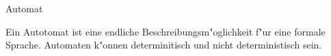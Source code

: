 \documentclass[class=article, crop=false]{standalone}
\begin{document}
\begin{zettel}{Automat}
\begin{flashcard}
    \begin{definition}
        Ein Autotomat ist eine endliche Beschreibungsm"oglichkeit f"ur eine formale Sprache.
        Automaten k"onnen determinitisch und nicht deterministisch sein.
    \end{definition}
\end{flashcard}
\end{zettel}
\end{document}
